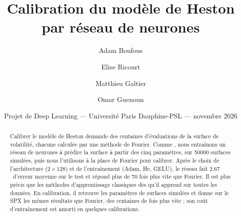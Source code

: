 \documentclass[11pt,a4paper]{article}
\title{Calibration du modèle de Heston par réseau de neurones}
\author{Adam Boufous \and Elise Ricourt \and Matthieu Galtier \and Omar Guenoun}
\date{Projet de Deep Learning --- Université Paris Dauphine-PSL --- novembre 2026}
\newcommand{\pb}{\,\text{pb}}                     %
\begin{document}
\maketitle

\begin{abstract}
Calibrer le modèle de Heston demande des centaines d'évaluations de la surface de volatilité, chacune calculée par
une méthode de Fourier. Comme \citet{horvath2021}, nous entraînons un réseau de neurones à prédire la surface à
partir des cinq paramètres, sur \num{50000} surfaces simulées, puis nous l'utilisons à la place de Fourier pour
calibrer. Après le choix de l'architecture ($2\times128$) et de l'entraînement (Adam, He, GELU), le réseau fait
\num{2.67}\pb\ d'erreur moyenne sur le test et répond plus de 70 fois plus vite que Fourier. Il est plus précis que
les méthodes d'apprentissage classiques dès qu'il apprend sur toutes les données. En calibration, il retrouve les
paramètres de surfaces simulées et donne sur le SPX les mêmes résultats que Fourier, des centaines de fois plus
vite ; son coût d'entraînement est amorti en quelques calibrations.
\end{abstract}

\tableofcontents












\end{document}

